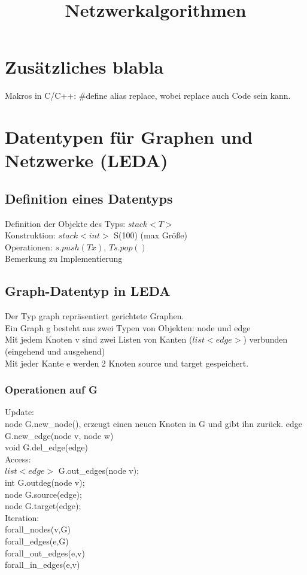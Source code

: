 \documentclass[a4paper]{article}
\newcommand{\pl}{\hspace*{1cm}}
\begin{document}
\title{Netzwerkalgorithmen}
\maketitle
\section{Zusätzliches blabla}
Makros in C/C++: \#define alias replace, wobei replace auch Code sein kann.\\

\section{Datentypen für Graphen und Netzwerke (LEDA)}
\subsection*{Definition eines Datentyps}
Definition der Objekte des Typs: $stack<T>$ \\
Konstruktion: $stack<int>$ S(100) (max Größe)\\
Operationen: $s.push(T x)$, $T s.pop()$\\
Bemerkung zu Implementierung\\
\subsection*{Graph-Datentyp in LEDA}
Der Typ graph repräsentiert gerichtete Graphen.\\
Ein Graph g besteht aus zwei Typen von Objekten: node und edge\\
Mit jedem Knoten v sind zwei Listen von Kanten ($list<edge>$) verbunden (eingehend und ausgehend)\\
Mit jeder Kante e werden 2 Knoten source und target gespeichert.\\
\subsubsection*{Operationen auf G}
Update:\\
\pl node G.new\_node(), erzeugt einen neuen Knoten in G und gibt ihn zurück.
\pl edge G.new\_edge(node v, node w)\\
\pl void G.del\_edge(edge)\\
Access:\\
\pl $list<edge>$ G.out\_edges(node v);\\
\pl int G.outdeg(node v);\\
\pl node G.source(edge);\\
\pl node G.target(edge);\\
Iteration:\\
\pl forall\_nodes(v,G)\\
\pl forall\_edges(e,G)\\
\pl forall\_out\_edges(e,v)\\
\pl forall\_in\_edges(e,v)\\
\end{document}
